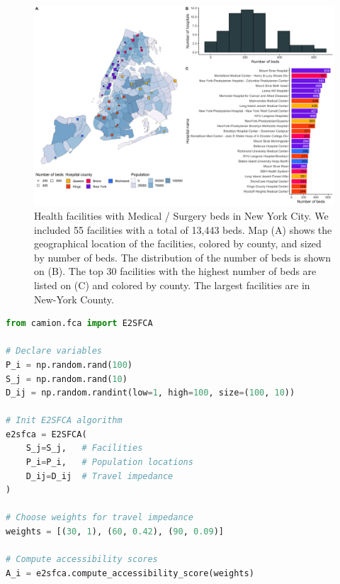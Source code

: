 \begin{figure}[h]
    \includegraphics[width=\textwidth]{images/camion-ny/fig1.png}
    \centering
    \caption{
        Health facilities with Medical / Surgery beds in New York City. We included 55 facilities with a total of 13,443 beds. Map (A) shows the geographical location of the facilities, colored by county, and sized by number of beds. The distribution of the number of beds is shown on (B). The top 30 facilities with the highest number of beds are listed on (C) and colored by county. The largest facilities are in New-York County.
    }
    \label{fig:camion-ny-beds}
\end{figure}

\begin{lstlisting}[language=Python, caption=Compute accessibility score with \ac{e2sfca}]
from camion.fca import E2SFCA

# Declare variables
P_i = np.random.rand(100)
S_j = np.random.rand(10)
D_ij = np.random.randint(low=1, high=100, size=(100, 10))

# Init E2SFCA algorithm
e2sfca = E2SFCA(
    S_j=S_j,   # Facilities
    P_i=P_i,   # Population locations
    D_ij=D_ij  # Travel impedance
)

# Choose weights for travel impedance
weights = [(30, 1), (60, 0.42), (90, 0.09)]

# Compute accessibility scores
A_i = e2sfca.compute_accessibility_score(weights)
\end{lstlisting}

